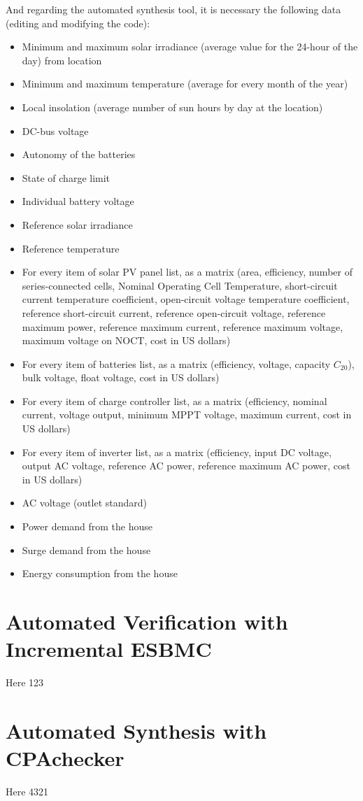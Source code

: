And regarding the automated synthesis tool, it is necessary the following data (editing and modifying the code):

\begin{itemize}
\item Minimum and maximum solar irradiance (average value for the 24-hour of the day) from location
\item Minimum and maximum temperature (average for every month of the year)
\item Local insolation (average number of sun hours by day at the location)
\item DC-bus voltage
\item Autonomy of the batteries
\item State of charge limit
\item Individual battery voltage
\item Reference solar irradiance
\item Reference temperature
\item For every item of solar PV panel list, as a matrix (area, efficiency, number of series-connected cells, Nominal Operating Cell Temperature, short-circuit current temperature coefficient, open-circuit voltage temperature coefficient, reference short-circuit current, reference open-circuit voltage, reference maximum power, reference maximum current, reference maximum voltage, maximum voltage on NOCT, cost in US dollars)
\item For every item of batteries list, as a matrix (efficiency, voltage, capacity $C_{20}$), bulk voltage, float voltage, cost in US dollars)
\item For every item of charge controller list, as a matrix (efficiency, nominal current, voltage  output, minimum MPPT voltage, maximum current, cost in US dollars)
\item For every item of inverter list, as a matrix (efficiency, input DC voltage, output AC voltage, reference AC power, reference maximum AC power, cost in US dollars)
\item AC voltage (outlet standard)
\item Power demand from the house
\item Surge demand from the house
\item Energy consumption from the house
\end{itemize}

\section{Automated Verification with Incremental ESBMC}
Here 123

\section{Automated Synthesis with CPAchecker}
Here 4321


